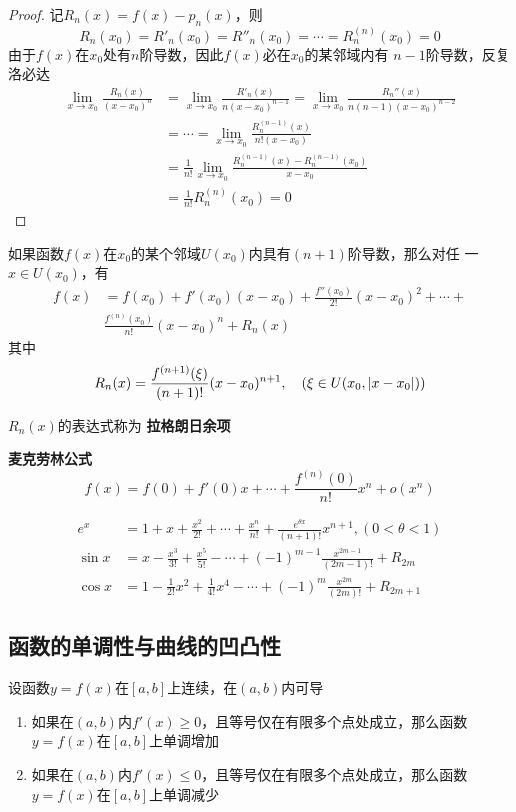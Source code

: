 \documentclass[11pt]{article}
\begin{document}
\begin{proof}
记\(R_n(x)=f(x)-p_n(x)\)，则
\begin{equation*}
R_n(x_0)=R'_n(x_0)=R''_n(x_0)=\cdots=R_n^{(n)}(x_0)=0
\end{equation*}
由于\(f(x)\)在\(x_0\)处有\(n\)阶导数，因此\(f(x)\)必在\(x_0\)的某邻域内有
\(n-1\)阶导数，反复洛必达
\begin{align*}
\lim_{x\to x_0}\frac{R_n(x)}{(x-x_0)^n}&=
\lim_{x\to x_0}\frac{R'_n(x)}{n(x-x_0)^{n-1}}=
\lim_{x\to x_0}\frac{R_n''(x)}{n(n-1)(x-x_0)^{n-2}}\\
&=\cdots=\lim_{x\to x_0}\frac{R^{(n-1)}_n(x)}{n!(x-x_0)}\\
&=\frac{1}{n!}\lim_{x\to x_0}\frac{R_n^{(n-1)}(x)-R_n^{(n-1)}(x_0)}{x-x_0}\\
&=\frac{1}{n!}R_n^{(n)}(x_0)=0
\end{align*}
\end{proof}

\begin{theorem}[泰勒中值定理 2]
如果函数\(f(x)\)在\(x_0\)的某个邻域\(U(x_0)\)内具有\((n+1)\)阶导数，那么对任
一\(x\in U(x_0)\)，有
\begin{align*}
f(x)&=f(x_0)+f'(x_0)(x-x_0)+\frac{f''(x_0)}{2!}(x-x_0)^2+\cdots+\\
&\frac{f^{(n)}(x_0)}{n!}(x-x_0)^n+R_n(x)
\end{align*}
其中
\begin{equation*}
R_n(x)=\frac{f^{(n+1)}(\xi)}{(n+1)!}(x-x_0)^{n+1},\quad (\xi\in U(x_0,\abs{x-x_0}))
\end{equation*}
\end{theorem}

\(R_n(x)\)的表达式称为 \textbf{拉格朗日余项}

\textbf{麦克劳林公式}
\begin{equation*}
f(x)=f(0)+f'(0)x+\cdots+\frac{f^{(n)}(0)}{n!}x^n+o(x^n)
\end{equation*}

\begin{align*}
e^x&=1+x+\frac{x^2}{2!}+\cdots+\frac{x^n}{n!}+\frac{e^{\theta x}}{(n+1)!}x^{n+1},(0<\theta<1)\\
\sin x&=x-\frac{x^3}{3!}+\frac{x^5}{5!}-\cdots+(-1)^{m-1}\frac{x^{2m-1}}{(2m-1)!}+R_{2m}\\
\cos x&=1-\frac{1}{2!}x^2+\frac{1}{4!}x^4-\cdots+(-1)^m\frac{x^{2m}}{(2m)!}+R_{2m+1}
\end{align*}
\subsection{函数的单调性与曲线的凹凸性}
\label{sec:org11e3d1a}
\begin{theorem}[]
设函数\(y=f(x)\)在\([a,b]\)上连续，在\((a,b)\)内可导
\begin{enumerate}
\item 如果在\((a,b)\)内\(f'(x)\ge0\)，且等号仅在有限多个点处成立，那么函数
\(y=f(x)\)在\([a,b]\)上单调增加
\item 如果在\((a,b)\)内\(f'(x)\le0\)，且等号仅在有限多个点处成立，那么函数
\(y=f(x)\)在\([a,b]\)上单调减少
\end{enumerate}
\end{theorem}
\end{document}

